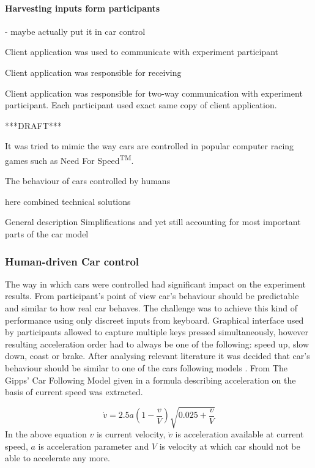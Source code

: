 \documentclass[11pt,english]{article}
\begin{document}
\paragraph{Harvesting inputs form participants} - maybe actually put it in car control



Client application was used to communicate with experiment participant

Client application was responsible for receiving 

Client application was responsible for two-way communication with experiment participant. 
Each participant used exact same copy of client application. 


***DRAFT***



It was tried to mimic the way cars are controlled in popular computer racing games such as Need For Speed\textsuperscript{TM}. 

The behaviour of cars controlled by humans 


here combined technical solutions 

General description Simplifications and yet still accounting for most important parts of
the car model


\subsubsection{Human-driven Car control}

The way in which cars were controlled had significant impact on the experiment results. From participant's point of view car's behaviour should be predictable and similar to how real car behaves. The challenge was to achieve this kind of performance using only discreet inputs from keyboard. Graphical interface used by participants allowed to capture multiple keys pressed simultaneously, however resulting acceleration order had to always be one of the following: speed up, slow down, coast or brake. After analysing relevant literature it was decided that car's behaviour should be similar to one of the cars following models \citep{treiber2013traffic}. From The Gipps' Car Following Model given in \citet{spyropoulou2007simulation} a formula describing acceleration on the basis of current speed was extracted.

\begin{equation}
\dot{v}=2.5a(1- \frac{v}{V})\sqrt{0.025+ \frac{v}{V}}
\end{equation}
In the above equation $v$ is current velocity, $\dot{v}$ is acceleration available at current speed, $a$ is acceleration parameter and $V$ is velocity at which car should not be able to accelerate any more.
\end{document}
